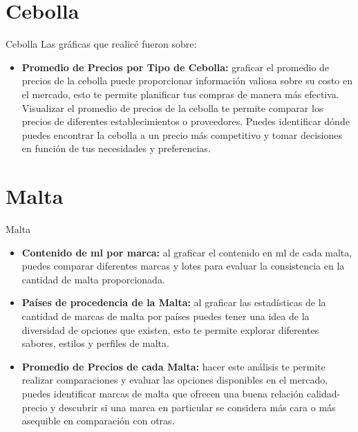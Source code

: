 \documentclass{beamer}
\begin{document}
\section{Cebolla}
\begin{frame}{Cebolla}
    \pause
    Las gráficas que realicé fueron sobre:
    \begin{itemize}
        \item \textbf{Promedio de Precios por Tipo de Cebolla:} graficar el promedio de precios de la cebolla puede proporcionar 
        información valiosa sobre su costo en el mercado, esto te permite planificar tus compras de manera más efectiva. Visualizar el promedio 
    de precios de la cebolla te permite comparar los precios de diferentes establecimientos o proveedores.
     Puedes identificar dónde puedes encontrar la cebolla a un precio más competitivo y tomar decisiones 
     en función de tus necesidades y preferencias.
    \end{itemize}
\end{frame}
\section{Malta}
\begin{frame}{Malta}
    \pause
    \begin{itemize}
        \item \textbf{Contenido de ml por marca:} al graficar el contenido en ml de cada malta, puedes comparar diferentes marcas y lotes para evaluar 
    la consistencia en la cantidad de malta proporcionada.
    
    \item \textbf{Países de procedencia de la Malta:} al graficar las estadísticas de la cantidad de marcas de malta por países puedes tener una idea de la
     diversidad de opciones que existen, esto te permite explorar diferentes sabores, estilos y perfiles 
     de malta.
    
     \item \textbf{Promedio de Precios de cada Malta:} hacer este análisis te permite realizar comparaciones y 
     evaluar las opciones disponibles en el mercado, puedes identificar marcas de malta que ofrecen 
     una buena relación calidad-precio y descubrir si una marca en particular se considera más cara o
     más asequible en comparación con otras.
    
    \end{itemize}
\end{frame}
\end{document}
